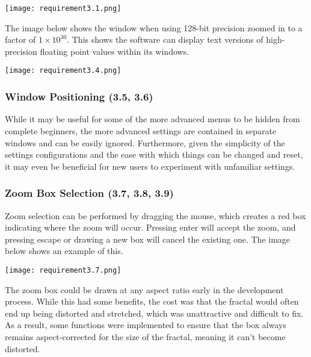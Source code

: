 \FloatBarrier
\begin{figure*}[htp]
	\centering
	\texttt{[image: requirement3.1.png]}
\end{figure*}
\FloatBarrier

\vspace{0.25cm}
The image below shows the  window when using 128-bit precision zoomed in to a factor of $1 \times 10^{30}$. This shows the software can display text versions of high-precision floating point values within its windows.

\FloatBarrier
\begin{figure*}[htp]
	\centering
	\texttt{[image: requirement3.4.png]}
\end{figure*}
\FloatBarrier

\subsubsection{Window Positioning (3.5, 3.6)}

While it may be useful for some of the more advanced menus to be hidden from complete beginners, the more advanced settings are contained in separate windows and can be easily ignored. Furthermore, given the simplicity of the settings configurations and the ease with which things can be changed and reset, it may even be beneficial for new users to experiment with unfamiliar settings.

\subsubsection{Zoom Box Selection (3.7, 3.8, 3.9)}

Zoom selection can be performed by dragging the mouse, which creates a red box indicating where the zoom will occur. Pressing enter will accept the zoom, and pressing escape or drawing a new box will cancel the existing one. The image below shows an example of this.

\FloatBarrier
\begin{figure*}[htp]
	\centering
	\texttt{[image: requirement3.7.png]}
\end{figure*}
\FloatBarrier

\vspace{0.5cm}

The zoom box could be drawn at any aspect ratio early in the development process. While this had some benefits, the cost was that the fractal would often end up being distorted and stretched, which was unattractive and difficult to fix. As a result, some functions were implemented to ensure that the box always remains aspect-corrected for the size of the fractal, meaning it can't become distorted.

